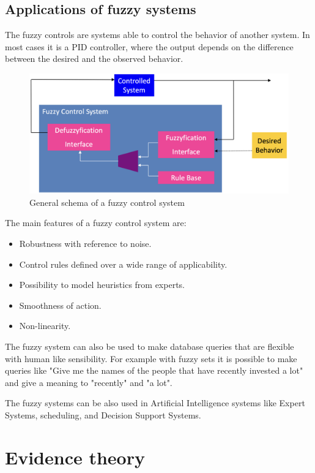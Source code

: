 \documentclass[12pt, a4paper]{report}
\theoremstyle{remark}
\begin{document}
    \section{Applications of fuzzy systems}
    The fuzzy controls are systems able to control the behavior of another system. In most cases it is a PID controller, where the output
    depends on the difference between the desired and the observed behavior. 
    \begin{figure}[H]
        \centering
        \includegraphics[width=0.5\linewidth]{images/control.png}
        \caption{General schema of a fuzzy control system}
    \end{figure}
    The main features of a fuzzy control system are: 
    \begin{itemize}
        \item Robustness with reference to noise.
        \item Control rules defined over a wide range of applicability.
        \item Possibility to model heuristics from experts.
        \item Smoothness of action.
        \item Non-linearity.
    \end{itemize}

    The fuzzy system can also be used to make database queries that are flexible with human like sensibility. For example with fuzzy sets it
    is possible to make queries like "Give me the names of the people that have recently invested a lot" and give a meaning to "recently" and 
    "a lot". 

    The fuzzy systems can be also used in Artificial Intelligence systems like Expert Systems, scheduling, and Decision Support Systems.

    \newpage

    \chapter{Evidence theory}
\end{document}
